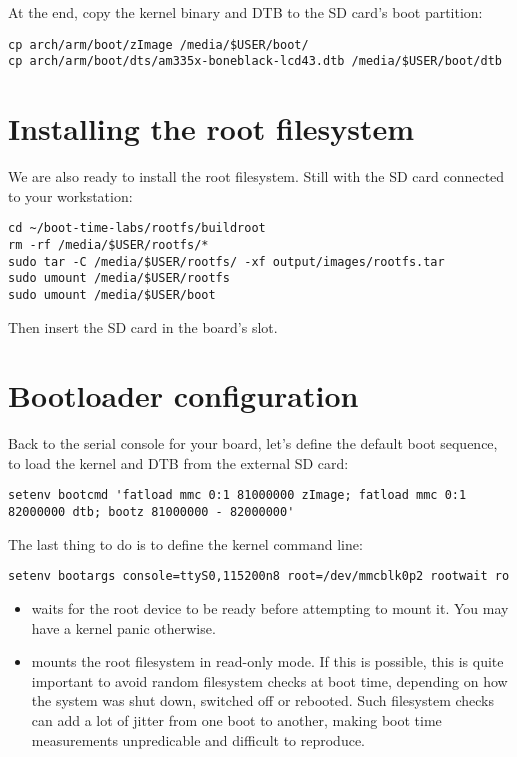 At the end, copy the kernel binary and DTB to the SD card's boot
partition:

\begin{verbatim}
cp arch/arm/boot/zImage /media/$USER/boot/
cp arch/arm/boot/dts/am335x-boneblack-lcd43.dtb /media/$USER/boot/dtb
\end{verbatim}

\section{Installing the root filesystem}

We are also ready to install the root filesystem. Still with the SD card
connected to your workstation:

\begin{verbatim}
cd ~/boot-time-labs/rootfs/buildroot
rm -rf /media/$USER/rootfs/*
sudo tar -C /media/$USER/rootfs/ -xf output/images/rootfs.tar
sudo umount /media/$USER/rootfs
sudo umount /media/$USER/boot
\end{verbatim}

Then insert the SD card in the board's slot.

\section{Bootloader configuration}

Back to the serial console for your board, let's define the default boot
sequence, to load the kernel and DTB from the external SD card:

{\footnotesize
\begin{verbatim}
setenv bootcmd 'fatload mmc 0:1 81000000 zImage; fatload mmc 0:1 82000000 dtb; bootz 81000000 - 82000000'
\end{verbatim}
}

{\footnotesize
The last thing to do is to define the kernel command line:
\begin{verbatim}
setenv bootargs console=ttyS0,115200n8 root=/dev/mmcblk0p2 rootwait ro
\end{verbatim}
}

\begin{itemize}
\item {} waits for the root device to be ready before
attempting to mount it. You may have a kernel panic otherwise.
\item {} mounts the root filesystem in read-only mode.
If this is possible, this is quite important to avoid random
filesystem checks at boot time, depending on how the system was shut
down, switched off or rebooted. Such filesystem checks can add a lot
of jitter from one boot to another, making boot time measurements
unpredicable and difficult to reproduce.
\end{itemize}

